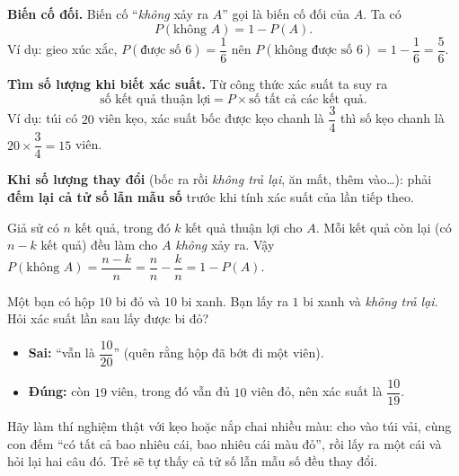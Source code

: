 \begin{knowbox}
\textbf{Biến cố đối.} Biến cố ``\emph{không} xảy ra $A$'' gọi là biến cố đối của $A$. Ta có
\[
P(\text{không } A)=1-P(A).
\]
Ví dụ: gieo xúc xắc, $P(\text{được số }6)=\dfrac16$ nên $P(\text{không được số }6)=1-\dfrac16=\dfrac56$.

\medskip
\textbf{Tìm số lượng khi biết xác suất.} Từ công thức xác suất ta suy ra
\[
\text{số kết quả thuận lợi}=P\times\text{số tất cả các kết quả}.
\]
Ví dụ: túi có $20$ viên kẹo, xác suất bốc được kẹo chanh là $\dfrac{3}{4}$ thì số kẹo chanh là $20\times\dfrac34=15$ viên.

\medskip
\textbf{Khi số lượng thay đổi} (bốc ra rồi \emph{không trả lại}, ăn mất, thêm vào\ldots): phải \textbf{đếm lại cả tử số lẫn mẫu số} trước khi tính xác suất của lần tiếp theo.
\end{knowbox}

\begin{proofbox}
Giả sử có $n$ kết quả, trong đó $k$ kết quả thuận lợi cho $A$. Mỗi kết quả còn lại (có $n-k$ kết quả) đều làm cho $A$ \emph{không} xảy ra. Vậy
$P(\text{không }A)=\dfrac{n-k}{n}=\dfrac{n}{n}-\dfrac{k}{n}=1-P(A)$.
\end{proofbox}

\begin{warnbox}
Một bạn có hộp $10$ bi đỏ và $10$ bi xanh. Bạn lấy ra $1$ bi xanh và \emph{không trả lại}. Hỏi xác suất lần sau lấy được bi đỏ?
\begin{itemize}[leftmargin=1.2em,itemsep=1pt,topsep=2pt]
\item \textbf{Sai:} ``vẫn là $\dfrac{10}{20}$'' (quên rằng hộp đã bớt đi một viên).
\item \textbf{Đúng:} còn $19$ viên, trong đó vẫn đủ $10$ viên đỏ, nên xác suất là $\dfrac{10}{19}$.
\end{itemize}
\end{warnbox}

\begin{parentbox}
Hãy làm thí nghiệm thật với kẹo hoặc nắp chai nhiều màu: cho vào túi vải, cùng con đếm ``có tất cả bao nhiêu cái, bao nhiêu cái màu đỏ'', rồi lấy ra một cái và hỏi lại hai câu đó. Trẻ sẽ tự thấy cả tử số lẫn mẫu số đều thay đổi.
\end{parentbox}

